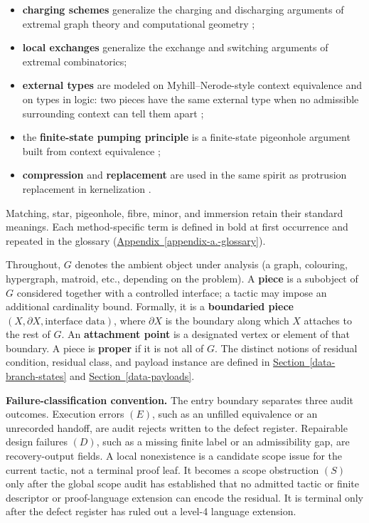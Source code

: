 \documentclass[
  11pt,
]{article}
\providecommand{\tightlist}{%
  \setlength{\itemsep}{0pt}\setlength{\parskip}{0pt}}
\theoremstyle{definition}
\newcommand{\secref}[1]{\hyperref[#1]{Section~\ref*{#1}}}
\newcommand{\appref}[1]{\hyperref[#1]{Appendix~\ref*{#1}}}
\begin{document}
\begin{itemize}
\tightlist
\item
  \textbf{charging schemes} generalize the charging and discharging
  arguments of extremal graph theory and computational geometry
  \citep{appel-haken-1977-discharging, appel-haken-koch-1977-reducibility, cranston-west-2017-discharging};
\item
  \textbf{local exchanges} generalize the exchange and switching
  arguments of extremal combinatorics;
\item
  \textbf{external types} are modeled on Myhill--Nerode-style context
  equivalence and on types in logic: two pieces have the same external type when no
  admissible surrounding context can tell them apart
  \citep{myhill-1957-automata, nerode-1958-linear, courcelle-1990-mso-graphs, courcelle-engelfriet-2012-graph-structure};
\item
  the \textbf{finite-state pumping principle} is a finite-state
  pigeonhole argument built from context equivalence
  \citep{myhill-1957-automata, nerode-1958-linear};
\item
  \textbf{compression} and \textbf{replacement} are used in the same
  spirit as protrusion replacement in kernelization
  \citep{bodlaender-etal-2009-meta-kernelization, kim-etal-2012-protrusion, garnero-etal-2013-explicit-kernels, jansen-wulms-2016-lower-bounds}.
\end{itemize}

Matching, star, pigeonhole, fibre, minor, and immersion retain their
standard meanings. Each method-specific term is defined in bold at first
occurrence and repeated in the glossary
(\appref{appendix-a.-glossary}).

Throughout, \(G\) denotes the ambient object under analysis (a graph,
colouring, hypergraph, matroid, etc., depending on the problem). A
\textbf{piece} is a subobject of \(G\) considered together with a
controlled interface; a tactic may impose an additional cardinality
bound. Formally, it is a \textbf{boundaried piece}
\((X,\partial X, \text{interface data})\), where \(\partial X\) is the
boundary along which \(X\) attaches to the rest of \(G\). An
\textbf{attachment point} is a designated vertex or element of that
boundary. A piece is \textbf{proper} if it is not all of \(G\). The
distinct notions of residual condition, residual class, and payload
instance are defined in \secref{data-branch-states} and
\secref{data-payloads}.

\textbf{Failure-classification convention.} The entry boundary separates
three audit outcomes. Execution errors \((E)\), such as an
unfilled equivalence or an unrecorded handoff, are audit rejects written to
the defect register. Repairable design failures \((D)\), such as a
missing finite label or an admissibility gap, are recovery-output
fields. A local nonexistence is a candidate scope issue for the current
tactic, not a terminal proof leaf. It becomes a scope obstruction \((S)\)
only after the global scope audit has established that no admitted tactic or
finite descriptor or proof-language extension can encode the residual. It is
terminal only after the defect register has ruled out a level-4 language
extension.
\end{document}
